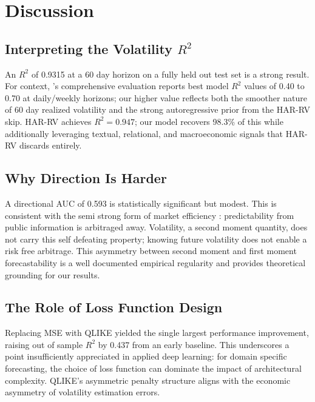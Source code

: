 \documentclass[10pt, twocolumn, a4paper]{article}
\begin{document}
\section{Discussion}
\label{sec:discussion}

\subsection{Interpreting the Volatility $R^2$}

An $R^2$ of 0.9315 at a 60 day horizon on a fully held out test set is a
strong result. For context, \citet{patton2011volatility}'s comprehensive
evaluation reports best model $R^2$ values of 0.40 to 0.70 at daily/weekly
horizons; our higher value reflects both the smoother nature of 60 day
realized volatility and the strong autoregressive prior from the HAR{-}RV
skip. HAR{-}RV achieves $R^2 = 0.947$; our model recovers 98.3\% of this
while additionally leveraging textual, relational, and macroeconomic signals
that HAR{-}RV discards entirely.

\subsection{Why Direction Is Harder}

A directional AUC of 0.593 is statistically significant but modest. This is
consistent with the semi strong form of market efficiency
\citep{fama1970efficient}: predictability from public information is
arbitraged away. Volatility, a second moment quantity, does not carry this
self defeating property; knowing future volatility does not enable a
risk free arbitrage. This asymmetry between second moment and first moment
forecastability is a well documented empirical regularity and provides
theoretical grounding for our results.

\subsection{The Role of Loss Function Design}

Replacing MSE with QLIKE yielded the single largest performance improvement,
raising out of sample $R^2$ by 0.437 from an early baseline. This
underscores a point insufficiently appreciated in applied deep learning:
for domain specific forecasting, the choice of loss function can dominate
the impact of architectural complexity. QLIKE's asymmetric penalty structure
aligns with the economic asymmetry of volatility estimation errors.
\end{document}
